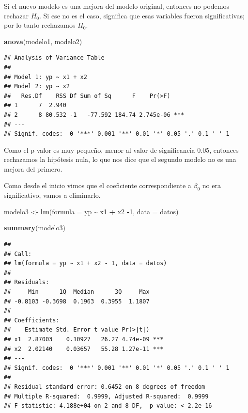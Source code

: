\documentclass[
]{book}
\newenvironment{Shaded}{\begin{snugshade}}{\end{snugshade}}
\newcommand{\AttributeTok}[1]{\textcolor[rgb]{0.13,0.29,0.53}{#1}}
\newcommand{\DecValTok}[1]{\textcolor[rgb]{0.00,0.00,0.81}{#1}}
\newcommand{\FunctionTok}[1]{\textcolor[rgb]{0.13,0.29,0.53}{\textbf{#1}}}
\newcommand{\NormalTok}[1]{#1}
\newcommand{\OtherTok}[1]{\textcolor[rgb]{0.56,0.35,0.01}{#1}}
\newcommand{\SpecialCharTok}[1]{\textcolor[rgb]{0.81,0.36,0.00}{\textbf{#1}}}
\begin{document}
Si el nuevo modelo es una mejora del modelo original, entonces no podemos rechazar \(H_0\). Si ese no es el caso, significa que esas variables fueron significativas; por lo tanto rechazamos \(H_0\).

\begin{Shaded}
\begin{Highlighting}[]
\FunctionTok{anova}\NormalTok{(modelo1, modelo2)}
\end{Highlighting}
\end{Shaded}

\begin{verbatim}
## Analysis of Variance Table
## 
## Model 1: yp ~ x1 + x2
## Model 2: yp ~ x2
##   Res.Df    RSS Df Sum of Sq      F    Pr(>F)    
## 1      7  2.940                                  
## 2      8 80.532 -1   -77.592 184.74 2.745e-06 ***
## ---
## Signif. codes:  0 '***' 0.001 '**' 0.01 '*' 0.05 '.' 0.1 ' ' 1
\end{verbatim}

Como el p-valor es muy pequeño, menor al valor de significancia 0.05, entonces rechazamos la hipótesis nula, lo que nos dice que el segundo modelo no es una mejora del primero.

Como desde el inicio vimos que el coeficiente correspondiente a \(\beta_0\) no era significativo, vamos a eliminarlo.

\begin{Shaded}
\begin{Highlighting}[]
\NormalTok{modelo3 }\OtherTok{\textless{}{-}} \FunctionTok{lm}\NormalTok{(}\AttributeTok{formula =}\NormalTok{ yp }\SpecialCharTok{\textasciitilde{}}\NormalTok{ x1 }\SpecialCharTok{+}\NormalTok{ x2 }\SpecialCharTok{{-}}\DecValTok{1}\NormalTok{, }\AttributeTok{data =}\NormalTok{ datos)}

\FunctionTok{summary}\NormalTok{(modelo3)}
\end{Highlighting}
\end{Shaded}

\begin{verbatim}
## 
## Call:
## lm(formula = yp ~ x1 + x2 - 1, data = datos)
## 
## Residuals:
##     Min      1Q  Median      3Q     Max 
## -0.8103 -0.3698  0.1963  0.3955  1.1807 
## 
## Coefficients:
##    Estimate Std. Error t value Pr(>|t|)    
## x1  2.87003    0.10927   26.27 4.74e-09 ***
## x2  2.02140    0.03657   55.28 1.27e-11 ***
## ---
## Signif. codes:  0 '***' 0.001 '**' 0.01 '*' 0.05 '.' 0.1 ' ' 1
## 
## Residual standard error: 0.6452 on 8 degrees of freedom
## Multiple R-squared:  0.9999, Adjusted R-squared:  0.9999 
## F-statistic: 4.188e+04 on 2 and 8 DF,  p-value: < 2.2e-16
\end{verbatim}
\end{document}
